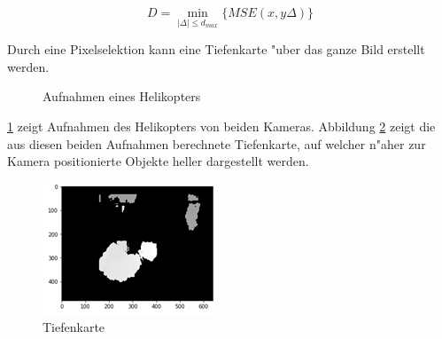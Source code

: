 \begin{equation}
D=\min_{|\Delta|\leq d_{max}} \{MSE(x,y\Delta)\}
\end{equation}

\noindent Durch eine Pixelselektion kann eine Tiefenkarte "uber das ganze Bild erstellt werden.

\begin{figure}%
	\centering
	\qquad
	\caption{Aufnahmen eines Helikopters}%
	\label{fig:stereoheli}%
\end{figure}

\noindent \ref{fig:stereoheli} zeigt Aufnahmen des Helikopters von beiden Kameras. Abbildung \ref{fig:tiefenkarte} zeigt die aus diesen beiden Aufnahmen berechnete Tiefenkarte, auf welcher n"aher zur Kamera positionierte Objekte heller dargestellt werden.

\begin{figure}[H]
	\includegraphics[scale=2.0]{bilder/Tiefenkarte}
	\caption[Tiefenkarte]{Tiefenkarte}
	\label{fig:tiefenkarte}%
\end{figure}

